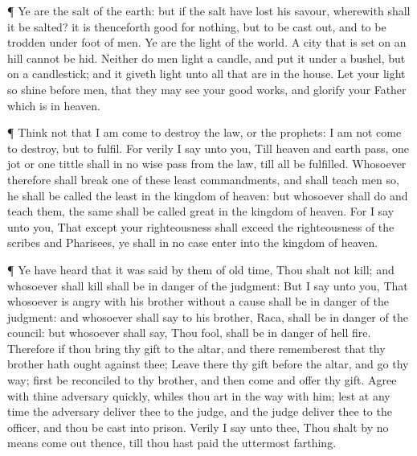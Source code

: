  ¶ Ye are the salt of the earth: but if the salt have lost
his savour, wherewith shall it be salted? it is thenceforth good for
nothing, but to be cast out, and to be trodden under foot of men.
 Ye are the light of the world. A city that is set on an
hill cannot be hid.  Neither do men light a candle, and put
it under a bushel, but on a candlestick; and it giveth light unto all
that are in the house.  Let your light so shine before men,
that they may see your good works, and glorify your Father which is in
heaven.

 ¶ Think not that I am come to destroy the law, or the
prophets: I am not come to destroy, but to fulfil.  For
verily I say unto you, Till heaven and earth pass, one jot or one tittle
shall in no wise pass from the law, till all be fulfilled. 
Whosoever therefore shall break one of these least commandments, and
shall teach men so, he shall be called the least in the kingdom of
heaven: but whosoever shall do and teach them, the same shall be called
great in the kingdom of heaven.  For I say unto you, That
except your righteousness shall exceed the righteousness of the scribes
and Pharisees, ye shall in no case enter into the kingdom of heaven.

 ¶ Ye have heard that it was said by them of old time, Thou
shalt not kill; and whosoever shall kill shall be in danger of the
judgment:  But I say unto you, That whosoever is angry with
his brother without a cause shall be in danger of the judgment: and
whosoever shall say to his brother, Raca, shall be in danger of the
council: but whosoever shall say, Thou fool, shall be in danger of hell
fire.  Therefore if thou bring thy gift to the altar, and
there rememberest that thy brother hath ought against thee;
 Leave there thy gift before the altar, and go thy way;
first be reconciled to thy brother, and then come and offer thy gift.
 Agree with thine adversary quickly, whiles thou art in the
way with him; lest at any time the adversary deliver thee to the judge,
and the judge deliver thee to the officer, and thou be cast into prison.
 Verily I say unto thee, Thou shalt by no means come out
thence, till thou hast paid the uttermost farthing.

